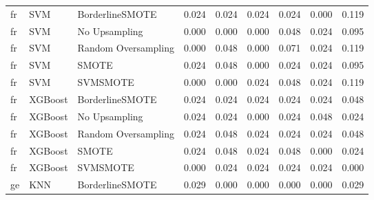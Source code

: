 \begin{tabular}{lllllllll}
      fr &                          SVM &     BorderlineSMOTE & 0.024 &                     0.024 &                 0.024 &                  0.024 &                                   0.000 &     0.119 \\
      fr &                          SVM &       No Upsampling & 0.000 &                     0.000 &                 0.000 &                  0.048 &                                   0.024 &     0.095 \\
      fr &                          SVM & Random Oversampling & 0.000 &                     0.048 &                 0.000 &                  0.071 &                                   0.024 &     0.119 \\
      fr &                          SVM &               SMOTE & 0.024 &                     0.048 &                 0.000 &                  0.024 &                                   0.024 &     0.095 \\
      fr &                          SVM &            SVMSMOTE & 0.000 &                     0.000 &                 0.024 &                  0.048 &                                   0.024 &     0.119 \\
      fr &                      XGBoost &     BorderlineSMOTE & 0.024 &                     0.024 &                 0.024 &                  0.024 &                                   0.024 &     0.048 \\
      fr &                      XGBoost &       No Upsampling & 0.024 &                     0.024 &                 0.000 &                  0.024 &                                   0.048 &     0.024 \\
      fr &                      XGBoost & Random Oversampling & 0.024 &                     0.048 &                 0.024 &                  0.024 &                                   0.024 &     0.048 \\
      fr &                      XGBoost &               SMOTE & 0.024 &                     0.048 &                 0.024 &                  0.048 &                                   0.000 &     0.024 \\
      fr &                      XGBoost &            SVMSMOTE & 0.000 &                     0.024 &                 0.024 &                  0.024 &                                   0.024 &     0.000 \\
      ge &                          KNN &     BorderlineSMOTE & 0.029 &                     0.000 &                 0.000 &                  0.000 &                                   0.000 &     0.029 \\

\end{tabular}
